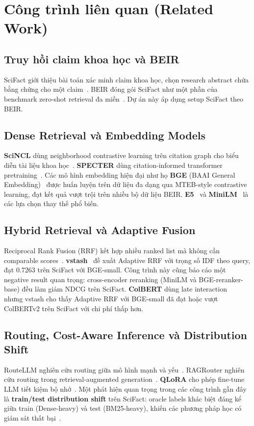 \section{Công trình liên quan (Related Work)}
\label{sec:related}

\subsection{Truy hồi claim khoa học và BEIR}
SciFact giới thiệu bài toán xác minh claim khoa học, chọn research abstract chứa bằng chứng cho một
claim~\citep{wadden2020scifact}. BEIR đóng gói SciFact như một phần của benchmark zero-shot retrieval
đa miền~\citep{thakur2021beir}. Dự án này áp dụng setup SciFact theo BEIR.

\subsection{Dense Retrieval và Embedding Models}
\textbf{SciNCL} dùng neighborhood contrastive learning trên citation graph cho biểu diễn tài liệu khoa
học~\citep{ostendorff2022scincl}. \textbf{SPECTER} dùng citation-informed transformer
pretraining~\citep{cohan2020specter}. Các mô hình embedding hiện đại như họ \textbf{BGE} (BAAI General
Embedding)~\citep{xiao2023bge} được huấn luyện trên dữ liệu đa dạng qua MTEB-style contrastive learning,
đạt kết quả vượt trội trên nhiều bộ dữ liệu BEIR. \textbf{E5}~\citep{wang2022e5} và
\textbf{MiniLM}~\citep{wang2020minilm} là các lựa chọn thay thế phổ biến.

\subsection{Hybrid Retrieval và Adaptive Fusion}
Reciprocal Rank Fusion (RRF) kết hợp nhiều ranked list mà không cần comparable
scores~\citep{cormack2009rrf}. \textbf{vstash}~\citep{steffens2026vstash} đề xuất Adaptive RRF với
trọng số IDF theo query, đạt 0.7263 trên SciFact với BGE-small. Công trình này cũng báo cáo một
negative result quan trọng: cross-encoder reranking (MiniLM và BGE-reranker-base) đều làm giảm NDCG
trên SciFact. \textbf{ColBERT} dùng late interaction~\citep{khattab2020colbert} nhưng vstash cho
thấy Adaptive RRF với BGE-small đã đạt hoặc vượt ColBERTv2 trên SciFact với chi phí thấp hơn.

\subsection{Routing, Cost-Aware Inference và Distribution Shift}
RouteLLM nghiên cứu routing giữa mô hình mạnh và yếu~\citep{ong2024routellm}. RAGRouter nghiên cứu
routing trong retrieval-augmented generation~\citep{zhang2025ragrouter}. \textbf{QLoRA} cho phép
fine-tune LLM tiết kiệm bộ nhớ~\citep{dettmers2023qlora}. Một phát hiện quan trọng trong các công
trình gần đây là \textbf{train/test distribution shift} trên SciFact: oracle labels khác biệt đáng
kể giữa train (Dense-heavy) và test (BM25-heavy), khiến các phương pháp học có giám sát thất
bại~\citep{wang2025hybrid}.

